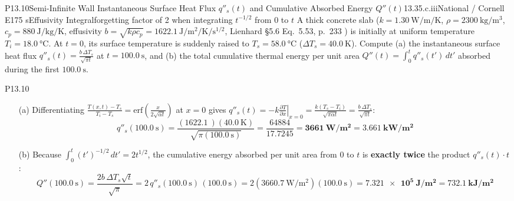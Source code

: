 \begin{problem}{P13.10}{Semi-Infinite Wall Instantaneous Surface Heat Flux $q''_s(t)$ and Cumulative Absorbed Energy $Q''(t)$}{13.3}{5.c.iii}{National / Cornell E1}{75 s}{Effusivity Integral}{forgetting factor of 2 when integrating $t^{-1/2}$ from $0$ to $t$}
A thick concrete slab ($k = \SI{1.30}{\watt\per\meter\per\kelvin}$, $\rho = \SI{2300}{\kilogram\per\cubic\meter}$, $c_p = \SI{880}{\joule\per\kilogram\per\kelvin}$, effusivity $b = \sqrt{k\rho c_p} = \SI{1622.1}{\joule\per\square\meter\per\kelvin\per\second\tothe{1/2}}$, Lienhard §5.6 Eq.~5.53, p.~233 ) is initially at uniform temperature $T_i = \SI{18.0}{\celsius}$. At $t = 0$, its surface temperature is suddenly raised to $T_s = \SI{58.0}{\celsius}$ ($\Delta T_s = \SI{40.0}{\kelvin}$). Compute (a) the instantaneous surface heat flux $q''_s(t) = \frac{b\,\Delta T_s}{\sqrt{\pi t}}$ at $t = \SI{100.0}{\second}$, and (b) the total cumulative thermal energy per unit area $Q''(t) = \int_0^t q''_s(t')\,dt'$ absorbed during the first $\SI{100.0}{\second}$.
\end{problem}
\begin{solution}{P13.10}
\begin{enumerate}
  \item[(a)] Differentiating $\frac{T(x,t)-T_s}{T_i-T_s} = \mathrm{erf}\!\left(\frac{x}{2\sqrt{\alpha t}}\right)$ at $x = 0$ gives $q''_s(t) = -k\left.\frac{\partial T}{\partial x}\right|_{x=0} = \frac{k(T_s - T_i)}{\sqrt{\pi\alpha t}} = \frac{b\,\Delta T_s}{\sqrt{\pi t}}$:
  \[
    q''_s(\SI{100.0}{\second}) = \frac{(\SI{1622.1}{})(\SI{40.0}{\kelvin})}{\sqrt{\pi(\SI{100.0}{\second})}} = \frac{\num{64884}}{17.7245} = \mathbf{\SI{3661}{\watt\per\square\meter}} = \mathbf{\SI{3.661}{\kilo\watt\per\square\meter}}
  \]
  \item[(b)] Because $\int_0^t (t')^{-1/2}\,dt' = 2 t^{1/2}$, the cumulative energy absorbed per unit area from $0$ to $t$ is \textbf{exactly twice} the product $q''_s(t)\cdot t$:
  \[
    Q''(\SI{100.0}{\second}) = \frac{2 b\,\Delta T_s \sqrt{t}}{\sqrt{\pi}} = 2\,q''_s(\SI{100.0}{\second})\,(\SI{100.0}{\second}) = 2(\SI{3660.7}{\watt\per\square\meter})(\SI{100.0}{\second}) = \mathbf{\SI{7.321e5}{\joule\per\square\meter}} = \mathbf{\SI{732.1}{\kilo\joule\per\square\meter}}
  \]
\end{enumerate}
\end{solution}


